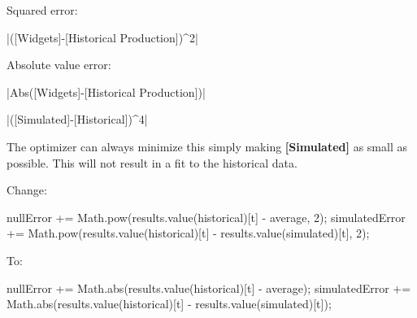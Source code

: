 \documentclass[]{memoir}
\newenvironment{Shaded}{}{}
\newcommand{\DecValTok}[1]{\textcolor[rgb]{0.25,0.63,0.44}{{#1}}}
\newcommand{\OtherTok}[1]{\textcolor[rgb]{0.00,0.44,0.13}{{#1}}}
\newcommand{\FunctionTok}[1]{\textcolor[rgb]{0.02,0.16,0.49}{{#1}}}
\newcommand{\NormalTok}[1]{{#1}}
\newcommand{\p}[1]{\textbf{{[}#1{]}}}
\begin{document}
Squared error:

|\NormalTok{([Widgets]-[Historical Production])^}\DecValTok{2}|

Absolute value error:

|\FunctionTok{Abs}\NormalTok{([Widgets]-[Historical Production])}|


|\NormalTok{([Simulated]-[Historical])^}\DecValTok{4}|


The optimizer can always minimize this simply making \p{Simulated} as
small as possible. This will not result in a fit to the historical data.


Change:

\begin{Shaded}
\begin{Highlighting}[]
\NormalTok{nullError += }\OtherTok{Math}\NormalTok{.}\FunctionTok{pow}\NormalTok{(}\OtherTok{results}\NormalTok{.}\FunctionTok{value}\NormalTok{(historical)[t] - average, }\DecValTok{2}\NormalTok{);}
\NormalTok{simulatedError += }\OtherTok{Math}\NormalTok{.}\FunctionTok{pow}\NormalTok{(}\OtherTok{results}\NormalTok{.}\FunctionTok{value}\NormalTok{(historical)[t] - }\OtherTok{results}\NormalTok{.}\FunctionTok{value}\NormalTok{(simulated)[t], }\DecValTok{2}\NormalTok{);}
\end{Highlighting}
\end{Shaded}

To:

\begin{Shaded}
\begin{Highlighting}[]
\NormalTok{nullError += }\OtherTok{Math}\NormalTok{.}\FunctionTok{abs}\NormalTok{(}\OtherTok{results}\NormalTok{.}\FunctionTok{value}\NormalTok{(historical)[t] - average);}
\NormalTok{simulatedError += }\OtherTok{Math}\NormalTok{.}\FunctionTok{abs}\NormalTok{(}\OtherTok{results}\NormalTok{.}\FunctionTok{value}\NormalTok{(historical)[t] - }\OtherTok{results}\NormalTok{.}\FunctionTok{value}\NormalTok{(simulated)[t]);}
\end{Highlighting}
\end{Shaded}
\end{document}
